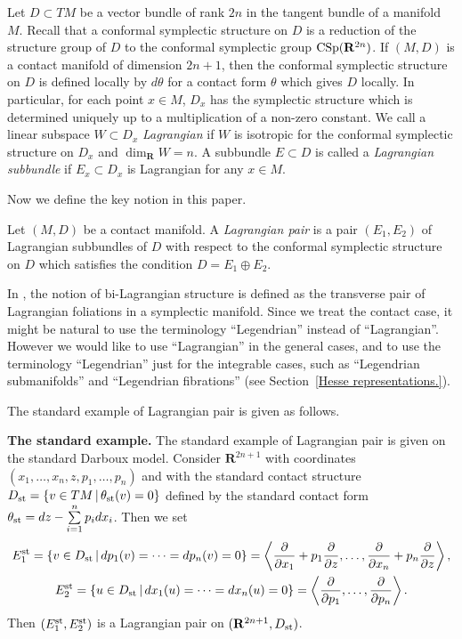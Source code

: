 \documentclass[pdftex]{sigma}
\begin{document}
Let $D \subset TM$ be a vector bundle of rank $2n$ in the tangent bundle of a manifold $M$.
Recall that a conformal symplectic structure on $D$ is a reduction of the structure group of $D$
to the conformal symplectic group ${\rm CSp}({\mathbf{R}}^{2n})$.
If $(M, D)$ is a contact manifold of dimension $2n+1$, then
the conformal symplectic structure on $D$ is def\/ined locally by $d\theta$ for a contact form
$\theta$ which gives $D$ locally.
In particular, for each point $x \in M$, $D_x$ has the symplectic structure which is determined uniquely up to
a multiplication of a non-zero constant.
We call a linear subspace $W \subset D_x$
{\it Lagrangian} if $W$ is isotropic for the conformal symplectic structure on $D_x$ and $\dim_{{\mathbf{R}}} W = n$.
A subbundle $E \subset D$ is called a {\it Lagrangian subbundle} if $E_x \subset D_x$ is Lagrangian for any $x \in M$.

Now we def\/ine the key notion in this paper.

\begin{Def}
Let $(M, D)$ be a contact manifold.
A {\it Lagrangian pair} is a pair $(E_1, E_2)$
of Lagrangian subbundles of $D$ with respect to the conformal symplectic structure
on $D$ which satisf\/ies the condition $D = E_1 \oplus E_2$.
\end{Def}

\begin{Rem}
In \cite[\S~5.2]{B}, the notion of bi-Lagrangian structure is def\/ined as the transverse pair of Lagrangian foliations in a symplectic manifold.
Since we treat the contact case, it might be natural to use
the terminology  ``Legendrian'' instead of ``Lagrangian''.
However we would like to use ``Lagrangian'' in the general cases, and
to use the terminology ``Legendrian'' just for the integrable cases, such as ``Legendrian submanifolds'' and
``Legendrian f\/ibrations'' (see Section~\ref{Hesse representations.}).
\end{Rem}

The standard example of Lagrangian pair is given as follows.

{\bf The standard example.}
The standard example of Lagrangian pair is given on
the standard Darboux model.
Consider ${\mathbf{R}}^{2n+1}$ with coordinates
$(x_1,\dots,x_n,z,p_1,\dots,p_n)$ and with the standard
contact structure
$D_{\rm{st}} = \{ v \in TM \,|\, \theta_{\rm{st}}(v) = 0\}$ def\/ined by
the standard contact form
$\theta_{\rm{st}} = dz - \sum\limits_{i=1}^np_idx_i$.
Then we set
\begin{gather*}
E^{\rm{st}}_1   =
\{ v \in D_{\rm{st}} \,|\,
dp_1(v) = \cdots = dp_n(v) = 0 \} = \left\langle \frac{\partial}{\partial x_1} +
p_1\frac{\partial}{\partial z},
\dots, \frac{\partial}{\partial x_n} + p_n\frac{\partial}{\partial z}\right\rangle,
\\
E^{\rm{st}}_2  =
\{ u \in D_{\rm{st}} \,|\,
dx_1(u) = \cdots = dx_n(u) = 0\} =
\left\langle \frac{\partial}{\partial p_1},
\dots, \frac{\partial}{\partial p_n}\right\rangle.
\end{gather*}
Then $(E^{\rm{st}}_1, E^{\rm{st}}_2)$ is a Lagrangian pair on
$({\mathbf{R}}^{2n+1}, D_{\rm{st}})$.
\end{document}
